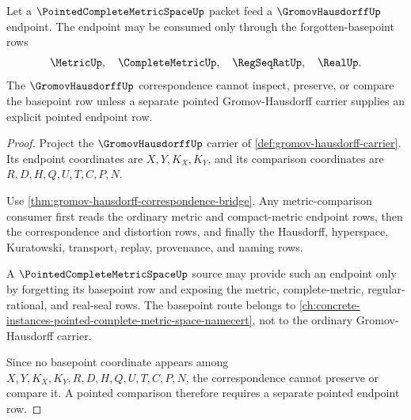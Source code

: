 \begin{theorem}
\label{thm:gromov-hausdorff-pointed-basepoint-forgetful-route}
Let a $\PointedCompleteMetricSpaceUp$ packet feed a
$\GromovHausdorffUp$ endpoint. The endpoint may be consumed only through the
forgotten-basepoint rows
$$
\MetricUp,\quad \CompleteMetricUp,\quad \RegSeqRatUp,\quad \RealUp .
$$
The $\GromovHausdorffUp$ correspondence cannot inspect, preserve, or compare
the basepoint row unless a separate pointed Gromov-Hausdorff carrier supplies
an explicit pointed endpoint row.
\end{theorem}
\begin{proof}
Project the $\GromovHausdorffUp$ carrier of
\autoref{def:gromov-hausdorff-carrier}. Its endpoint coordinates are
$X,Y,K_X,K_Y$, and its comparison coordinates are $R,D,H,Q,U,T,C,P,N$.

Use \autoref{thm:gromov-hausdorff-correspondence-bridge}. Any
metric-comparison consumer first reads the ordinary metric and compact-metric
endpoint rows, then the correspondence and distortion rows, and finally the
Hausdorff, hyperspace, Kuratowski, transport, replay, provenance, and naming
rows.

A $\PointedCompleteMetricSpaceUp$ source may provide such an endpoint only by
forgetting its basepoint row and exposing the metric, complete-metric,
regular-rational, and real-seal rows. The basepoint route belongs to
\autoref{ch:concrete-instances-pointed-complete-metric-space-namecert}, not to
the ordinary Gromov-Hausdorff carrier.

Since no basepoint coordinate appears among $X,Y,K_X,K_Y,R,D,H,Q,U,T,C,P,N$,
the correspondence cannot preserve or compare it. A pointed comparison
therefore requires a separate pointed endpoint row.
\end{proof}



